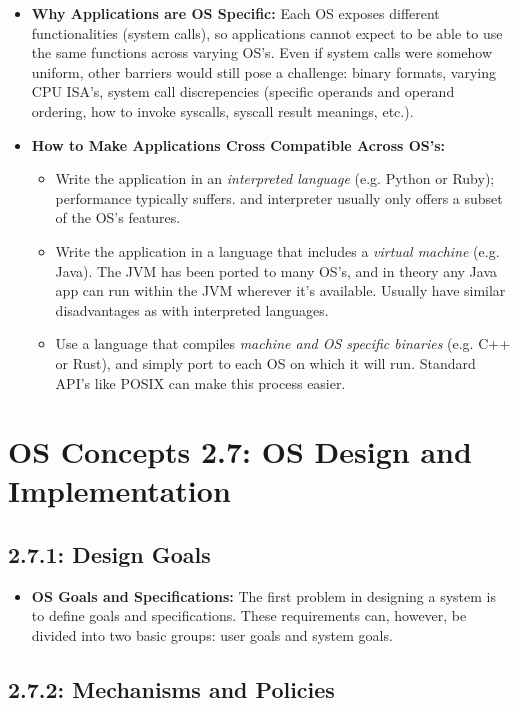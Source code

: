 \documentclass[12pt]{article}
\begin{document}
\begin{itemize}
    \item \textbf{Why Applications are OS Specific:} Each OS exposes different functionalities (system calls), so applications cannot expect to be able to use the same functions across varying OS's. Even if system calls were somehow uniform, other barriers would still pose a challenge: binary formats, varying CPU ISA's, system call discrepencies (specific operands and operand ordering, how to invoke syscalls, syscall result meanings, etc.).
    \item \textbf{How to Make Applications Cross Compatible Across OS's:}
    \begin{itemize}
        \item Write the application in an \textit{interpreted language} (e.g. Python or Ruby); performance typically suffers. and interpreter usually only offers a subset of the OS's features.
        \item Write the application in a language that includes a \textit{virtual machine} (e.g. Java). The JVM has been ported to many OS's, and in theory any Java app can run within the JVM wherever it's available. Usually have similar disadvantages as with interpreted languages.
        \item Use a language that compiles \textit{machine and OS specific binaries} (e.g. C++ or Rust), and simply port to each OS on which it will run. Standard API's like POSIX can make this process easier.
    \end{itemize}
\end{itemize}

\section*{OS Concepts 2.7: OS Design and Implementation}

\subsection*{2.7.1: Design Goals}

\begin{itemize}
    \item \textbf{OS Goals and Specifications:} The first problem in designing a system is to define goals and specifications. These requirements can, however, be divided into two basic groups: user goals and system goals.
\end{itemize}

\subsection*{2.7.2: Mechanisms and Policies}
\end{document}
